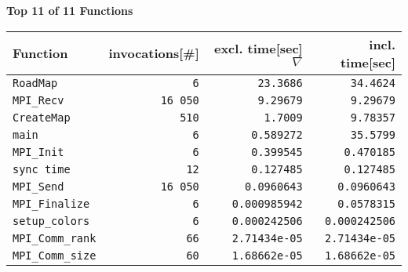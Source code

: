 \documentclass[a4paper,10pt]{article}
\begin{document}
\newpage

\begin{center}\small
{\Large \bf Top 11 of 11 Functions}
\bigskip
\begin{longtable}{|l||r|r|r|}

   \hline
   \bf Function & \bf invocations[\#] & \bf excl. time[sec] $\nabla$ & \bf incl. time[sec] \\
   \hline\hline
  \verb|RoadMap| &   \verb|6| &   \verb|23.3686| &   \verb|34.4624| \\
  \verb|MPI_Recv| &   \verb|16 050| &   \verb|9.29679| &   \verb|9.29679| \\
  \verb|CreateMap| &   \verb|510| &   \verb|1.7009| &   \verb|9.78357| \\
      \hline
  \verb|main| &   \verb|6| &   \verb|0.589272| &   \verb|35.5799| \\
  \verb|MPI_Init| &   \verb|6| &   \verb|0.399545| &   \verb|0.470185| \\
  \verb|sync time| &   \verb|12| &   \verb|0.127485| &   \verb|0.127485| \\
      \hline
  \verb|MPI_Send| &   \verb|16 050| &   \verb|0.0960643| &   \verb|0.0960643| \\
  \verb|MPI_Finalize| &   \verb|6| &   \verb|0.000985942| &   \verb|0.0578315| \\
  \verb|setup_colors| &   \verb|6| &   \verb|0.000242506| &   \verb|0.000242506| \\
      \hline
  \verb|MPI_Comm_rank| &   \verb|66| &   \verb|2.71434e-05| &   \verb|2.71434e-05| \\
  \verb|MPI_Comm_size| &   \verb|60| &   \verb|1.68662e-05| &   \verb|1.68662e-05| \\
   \hline
\end{longtable}

\end{center}
\newpage
\end{document}
